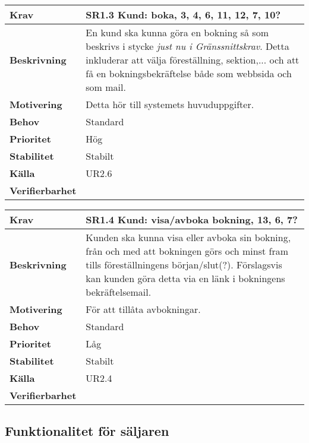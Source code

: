 \documentclass[a4paper, twoside, 11pt, titlepage]{article}
\begin{document}
	\begin{tabular} { p{2.6cm} p{12.5cm} }
		\hline
		\sffamily\textbf{Krav} & \sffamily\textbf{SR1.3 Kund: boka, 3, 4, 6, 11, 12, 7, 10? } \\
		\hline
		\sffamily\textbf{Beskrivning} & En kund ska kunna göra en bokning så som beskrivs i stycke \emph{just nu i Gränssnittskrav}. Detta inkluderar att välja föreställning, sektion,... och att få en bokningsbekräftelse både som webbsida och som mail.  \\
		\hline
		\sffamily\textbf{Motivering} & Detta hör till systemets huvuduppgifter.  \\
		\hline
		\sffamily\textbf{Behov} & Standard  \\
		\hline
		\sffamily\textbf{Prioritet} & Hög  \\
		\hline
		\sffamily\textbf{Stabilitet} & Stabilt  \\
		\hline
		\sffamily\textbf{Källa} & UR2.6  \\
		\hline
		\sffamily\textbf{Verifierbarhet} &   \\
		\hline
	\end{tabular}
	\vspace{6mm}

	\begin{tabular} { p{2.6cm} p{12.5cm} }
		\hline
		\sffamily\textbf{Krav} & \sffamily\textbf{SR1.4 Kund: visa/avboka bokning, 13, 6, 7? } \\
		\hline
		\sffamily\textbf{Beskrivning} & Kunden ska kunna visa eller avboka sin bokning, från och med att bokningen görs och minst fram tills föreställningens början/slut(?). Förslagsvis kan kunden göra detta via en länk i bokningens bekräftelsemail.  \\
		\hline
		\sffamily\textbf{Motivering} & För att tillåta avbokningar.  \\
		\hline
		\sffamily\textbf{Behov} & Standard  \\
		\hline
		\sffamily\textbf{Prioritet} & Låg  \\
		\hline
		\sffamily\textbf{Stabilitet} & Stabilt  \\
		\hline
		\sffamily\textbf{Källa} & UR2.4  \\
		\hline
		\sffamily\textbf{Verifierbarhet} &   \\
		\hline
	\end{tabular}


	\subsection{Funktionalitet för säljaren}
\end{document}
